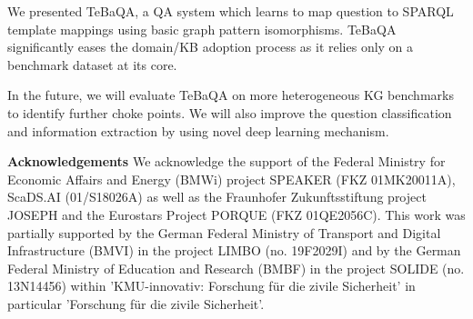 \documentclass{IOS-Book-Article}
\begin{document}
We presented TeBaQA, a QA system which learns to map question to SPARQL template mappings using basic graph pattern isomorphisms. 
TeBaQA significantly eases the domain/KB adoption process as it relies only on a benchmark dataset at its core. 
 
In the future, we will evaluate TeBaQA on more heterogeneous KG benchmarks to identify further choke points. We will also improve the question classification and information extraction by using novel deep learning mechanism. 

\textbf{Acknowledgements} We acknowledge the support of the Federal Ministry for Economic Affairs and Energy (BMWi) project SPEAKER (FKZ 01MK20011A), ScaDS.AI (01/S18026A) as well as the Fraunhofer Zukunftsstiftung project JOSEPH and the Eurostars Project PORQUE (FKZ 01QE2056C). This work was partially supported by the German Federal Ministry of Transport and Digital Infrastructure (BMVI) in the project LIMBO (no. 19F2029I) and by the German Federal Ministry of Education and Research (BMBF) in the project SOLIDE (no. 13N14456) within ’KMU-innovativ: Forschung f\"ur die zivile Sicherheit’ in particular ’Forschung f\"ur die zivile Sicherheit’.



\end{document}
